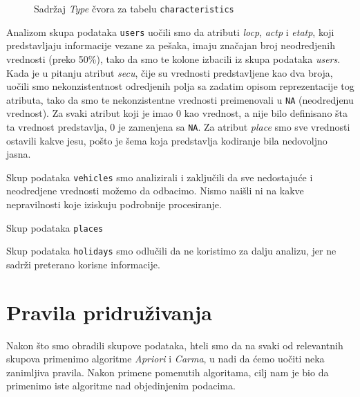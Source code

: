 \documentclass[a4paper,10pt]{article}
\begin{document}
\begin{figure}[h]
 \centering
 \caption{Sadržaj \textit{Type} čvora za tabelu \texttt{characteristics}}
\end{figure}

Analizom skupa podataka \texttt{users} uočili smo da atributi \textit{locp}, \textit{actp} i \textit{etatp}, koji predstavljaju informacije vezane
za pešaka, imaju značajan broj neodredjenih vrednosti (preko 50\%), tako da smo te kolone izbacili iz skupa podataka \textit{users}. Kada je u pitanju
atribut \textit{secu}, čije su vrednosti predstavljene kao dva broja, uočili smo nekonzistentnost odredjenih polja sa zadatim opisom reprezentacije tog atributa,
tako da smo te nekonzistentne vrednosti preimenovali u \texttt{NA} (neodredjenu vrednost). Za svaki atribut koji je imao 0 kao vrednost, a nije bilo definisano
šta ta vrednost predstavlja, 0 je zamenjena sa \texttt{NA}. Za atribut \textit{place} smo sve vrednosti ostavili kakve jesu, pošto je šema 
koja predstavlja kodiranje bila nedovoljno jasna.

Skup podataka \texttt{vehicles} smo analizirali i zaključili da sve nedostajuće i neodredjene vrednosti možemo da odbacimo. Nismo naišli ni na kakve
nepravilnosti koje iziskuju podrobnije procesiranje.

Skup podataka \texttt{places}

Skup podataka \texttt{holidays} smo odlučili da ne koristimo za dalju analizu, jer ne sadrži preterano korisne informacije.

\section{Pravila pridruživanja}
Nakon što smo obradili skupove podataka, hteli smo da na svaki od relevantnih skupova primenimo algoritme \textit{Apriori} i \textit{Carma},
u nadi da ćemo uočiti neka zanimljiva pravila. Nakon primene pomenutih algoritama, cilj nam je bio da primenimo iste algoritme nad objedinjenim podacima.
\end{document}
